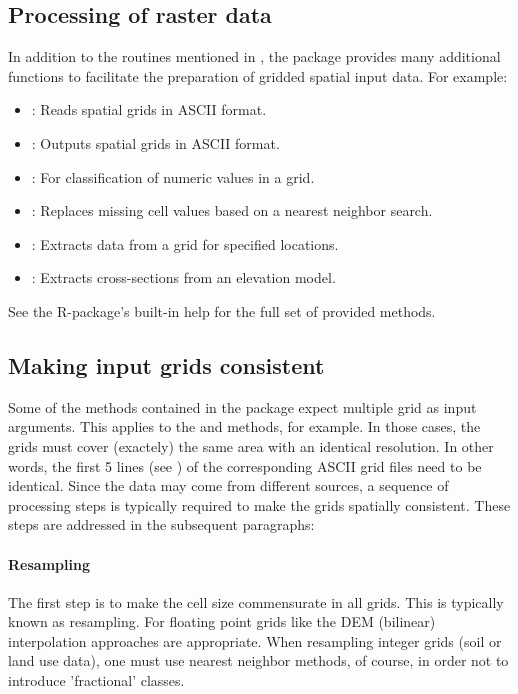 \subsection{Processing of raster data} \label{sec:topocatch:hints-gridMethods}
In addition to the routines mentioned in , the  package provides many additional functions to facilitate the preparation of gridded spatial input data. For example:
\begin{itemize}
  \item {}: Reads spatial grids in ASCII format.
  \item {}: Outputs spatial grids in ASCII format.
  \item {}: For classification of numeric values in a grid.
  \item {}: Replaces missing cell values based on a nearest neighbor search.
  \item {}: Extracts data from a grid for specified locations.
  \item {}: Extracts cross-sections from an elevation model.   
\end{itemize}

See the R-package's built-in help for the full set of provided methods.

\subsection{Making input grids consistent} \label{sec:topocatch:hints-gridConsistent}

Some of the methods contained in the  package expect multiple grid as input arguments. This applies to the  and  methods, for example. In those cases, the grids must cover (exactely) the same area with an identical resolution. In other words, the first 5 lines (see ) of the corresponding ASCII grid files need to be identical. Since the data may come from different sources, a sequence of processing steps is typically required to make the grids spatially consistent. These steps are addressed in the subsequent paragraphs:

\paragraph{Resampling}
The first step is to make the cell size commensurate in all grids. This is typically known as resampling. For floating point grids like the DEM (bilinear) interpolation approaches are appropriate. When resampling integer grids (soil or land use data), one must use nearest neighbor methods, of course, in order not to introduce 'fractional' classes.

